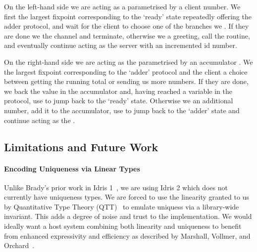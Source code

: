 \documentclass{easychair}
\begin{document}
\noindent\begin{minipage}[t]{.49\textwidth}
\end{minipage}\hfill
\begin{minipage}[t]{.49\textwidth}
\end{minipage}

\vspace*{1em}

On the left-hand side we are acting as a  parametrised by a client
 number. We first  the largest fixpoint
corresponding to the `ready' state repeatedly offering the adder protocol,
and wait for the client to choose one of the branches we .
If they are done we  the channel and terminate,
otherwise we  a greeting, call the
 routine,
and eventually continue acting as the server with an incremented id number.

On the right-hand side we are acting as the  parametrised by an
accumulator . We  the largest
fixpoint corresponding to the `adder' protocol and
 the client a choice between getting the
running total or sending us more numbers.
%
If they are done, we  back the value in the accumulator
and, having reached a  variable in the protocol,
use  to jump back to the `ready' state.
%
Otherwise we  an additional number,
add it to the accumulator, use  to jump
back to the `adder' state and continue acting as the .

\subsection*{Limitations and Future Work}

\paragraph{Encoding Uniqueness via Linear Types}
Unlike Brady's prior work in Idris 1~\cite{DBLP:journals/aghcs/Brady17},
we are using Idris 2 which does not currently have uniqueness types.
We are forced to use the linearity granted to us by
Quantitative Type Theory (QTT)~\cite{DBLP:conf/birthday/McBride16,DBLP:conf/lics/Atkey18}
to emulate uniquess via a library-wide invariant.
%
This adds a degree of noise and trust to the implementation.
We would ideally want a host system combining both linearity and uniqueness
to benefit from enhanced expressivity and efficiency as described
by Marshall, Vollmer, and Orchard~\cite{DBLP:conf/esop/MarshallVO22}.
\end{document}
